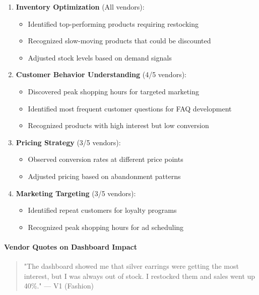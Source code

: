 \documentclass[12pt,a4paper]{article}
\begin{document}
\begin{enumerate}
    \item \textbf{Inventory Optimization} (All vendors):
    \begin{itemize}
        \item Identified top-performing products requiring restocking
        \item Recognized slow-moving products that could be discounted
        \item Adjusted stock levels based on demand signals
    \end{itemize}
    
    \item \textbf{Customer Behavior Understanding} (4/5 vendors):
    \begin{itemize}
        \item Discovered peak shopping hours for targeted marketing
        \item Identified most frequent customer questions for FAQ development
        \item Recognized products with high interest but low conversion
    \end{itemize}
    
    \item \textbf{Pricing Strategy} (3/5 vendors):
    \begin{itemize}
        \item Observed conversion rates at different price points
        \item Adjusted pricing based on abandonment patterns
    \end{itemize}
    
    \item \textbf{Marketing Targeting} (3/5 vendors):
    \begin{itemize}
        \item Identified repeat customers for loyalty programs
        \item Recognized peak shopping hours for ad scheduling
    \end{itemize}
\end{enumerate}

\paragraph{Vendor Quotes on Dashboard Impact}

\begin{quote}
"The dashboard showed me that silver earrings were getting the most interest, but I was always out of stock. I restocked them and sales went up 40\%." --- V1 (Fashion)
\end{quote}
\end{document}
